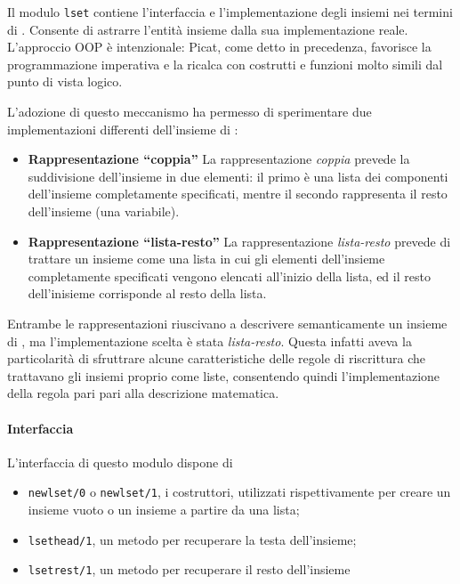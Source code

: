 \documentclass[12pt,a4paper,openright]{book} %
\begin{document}
Il modulo \texttt{lset} contiene l'interfaccia e l'implementazione degli insiemi nei termini di \lset{}. Consente di astrarre l'entità insieme dalla sua implementazione reale. L'approccio OOP è intenzionale: Picat, come detto in precedenza, favorisce la programmazione imperativa e la ricalca con costrutti e funzioni molto simili dal punto di vista logico.

L'adozione di questo meccanismo ha permesso di sperimentare due implementazioni differenti dell'insieme di \lset{}:

\begin{itemize}
	\item \textbf{Rappresentazione ``coppia''} La rappresentazione \emph{coppia} prevede la suddivisione dell'insieme in due elementi: il primo è una lista dei componenti dell'insieme completamente specificati, mentre il secondo rappresenta il resto dell'insieme (una variabile).
	\item \textbf{Rappresentazione ``lista-resto''} La rappresentazione \emph{lista-resto} prevede di trattare un insieme come una lista in cui gli elementi dell'insieme completamente specificati vengono elencati all'inizio della lista, ed il resto dell'inisieme corrisponde al resto della lista.
\end{itemize}

Entrambe le rappresentazioni riuscivano a descrivere semanticamente un insieme di \lset{}, ma l'implementazione scelta è stata \emph{lista-resto}. Questa infatti aveva la particolarità di sfruttrare alcune caratteristiche delle regole di riscrittura che trattavano gli insiemi proprio come liste, consentendo quindi l'implementazione della regola pari pari alla descrizione matematica.

\paragraph{Interfaccia}

L'interfaccia di questo modulo dispone di
\begin{itemize}
	\item \texttt{new\textunderscore lset/0} o \texttt{new\textunderscore lset/1}, i costruttori, utilizzati rispettivamente per creare un insieme vuoto o un insieme a partire da una lista;
	\item \texttt{lset\textunderscore head/1}, un metodo per recuperare la testa dell'insieme;
	\item \texttt{lset\textunderscore rest/1}, un metodo per recuperare il resto dell'insieme
\end{itemize}
\end{document}
